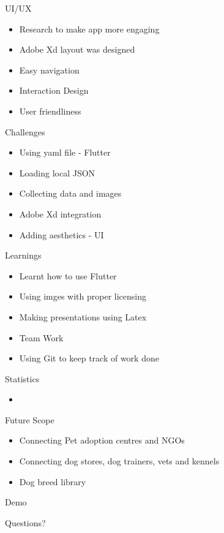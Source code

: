 \documentclass[14pt]{beamer}
\begin{document}
\begin{frame}{UI/UX}
    \begin{itemize}
        \item Research to make app more engaging
        \item Adobe Xd layout was designed 
        \item Easy navigation
        \item Interaction Design
        \item User friendliness
    \end{itemize}
\end{frame}

\begin{frame}{Challenges}
    \begin{itemize}
        \item Using yaml file - Flutter
        \item Loading local JSON
        \item Collecting data and images
        \item Adobe Xd integration
        \item Adding aesthetics - UI
    \end{itemize}
\end{frame}

\begin{frame}{Learnings}
    \begin{itemize}
        \item Learnt how to use Flutter
        \item Using imges with proper licensing
        \item Making presentations using Latex
        \item Team Work
        \item Using Git to keep track of work done
    \end{itemize}
\end{frame}

\begin{frame}{Statistics}
    \begin{itemize}
        \item 
    \end{itemize}
\end{frame}

\begin{frame}{Future Scope}
    \begin{itemize}
        \item Connecting Pet adoption centres and NGOs
        \item Connecting dog stores, dog trainers, vets and kennels 
        \item Dog breed library
    \end{itemize}
\end{frame}

\begin{frame}[standout]
    Demo
\end{frame}

\begin{frame}[standout]
    Questions?
\end{frame}
\end{document}
